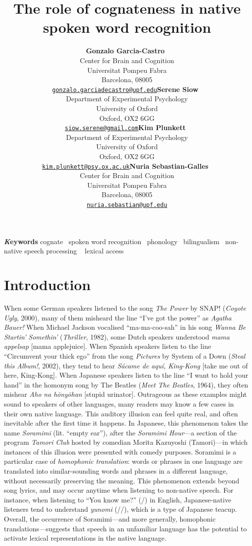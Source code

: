 \documentclass[
]{article}
\title{The role of cognateness in native spoken word recognition}
\author{\textbf{Gonzalo
Garcia-Castro}~\orcidlink{0000-0002-8553-4209}\\Center for Brain and
Cognition\\Universitat Pompeu Fabra\\Barcelona,
08005\\\texttt{\href{mailto:gonzalo.garciadecastro@upf.edu}{gonzalo.garciadecastro@upf.edu}}\And\textbf{Serene
Siow}~\orcidlink{0000-0001-6482-2191}\\Department of Experimental
Psychology\\University of Oxford\\Oxford, OX2
6GG\\\texttt{\href{mailto:siow.serene@gmail.com}{siow.serene@gmail.com}}\And\textbf{Kim
Plunkett}~\orcidlink{0000-0003-0216-7480}\\Department of Experimental
Psychology\\University of Oxford\\Oxford, OX2
6GG\\\texttt{\href{mailto:kim.plunkett@psy.ox.ac.uk}{kim.plunkett@psy.ox.ac.uk}}\And\textbf{Nuria
Sebastian-Galles}~\orcidlink{0000-0001-6938-2498}\\Center for Brain and
Cognition\\Universitat Pompeu Fabra\\Barcelona,
08005\\\texttt{\href{mailto:nuria.sebastian@upf.edu}{nuria.sebastian@upf.edu}}}
\date{}
\begin{document}
\maketitle
{\bfseries \emph Keywords}
\def\sep{\textbullet\ }
cognate \sep spoken word
recognition \sep phonology \sep bilingualism \sep non-native speech
processing \sep 
lexical access



\section{Introduction}\label{introduction}

When some German speakers listened to the song \emph{The Power} by SNAP!
(\emph{Coyote Ugly}, 2000), many of them misheard the line ``I've got
the power'' as \emph{Agatha Bauer!} When Michael Jackson vocalised
``ma-ma-coo-sah'' in his song \emph{Wanna Be Startin' Somethin'}
(\emph{Thriller}, 1982), some Dutch speakers understood \emph{mama
appelsap} {[}mama applejuice{]}. When Spanish speakers listen to the
line ``Circumvent your thick ego'' from the song \emph{Pictures} by
System of a Down (\emph{Steal this Album!}, 2002), they tend to hear
\emph{Sácame de aquí, King-Kong} {[}take me out of here, King-Kong{]}.
When Japanese speakers listen to the line ``I want to hold your hand''
in the homonym song by The Beatles (\emph{Meet The Beatles}, 1964), they
often mishear \emph{Aho na hōnyōhan} {[}stupid urinator{]}. Outrageous
as these examples might sound to speakers of other languages, many
readers may know a few cases in their own native language. This auditory
illusion can feel quite real, and often inevitable after the first time
it happens. In Japanese, this phenomenon takes the name \emph{Soramimi}
(lit. ``empty ear''), after the \emph{Soramimi Hour}---a section of the
program \emph{Tamori Club} hosted by comedian Morita Kazuyoshi
(Tamori)---in which instances of this illusion were presented with
comedy purposes. Soramimi is a particular case of \emph{homophonic
translation}: words or phrases in one language are translated into
similar-sounding words and phrases in a different language, without
necessarily preserving the meaning. This phenomenon extends beyond song
lyrics, and may occur anytime when listening to non-native speech. For
instance, when listening to ``You know me?'' (/)
in English, Japanese-native listeners tend to understand \emph{yunomi}
(//), which is a type of Japanese teacup. Overall, the
occurrence of Soramimi---and more generally, homophonic
translations---suggests that speech in an unfamiliar language has the
potential to activate lexical representations in the native language.
\end{document}
